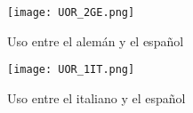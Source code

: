 \begin{figure}[h!]
	\centering
	\texttt{[image: UOR\_2GE.png]}
	\label{fig.U_GS}
	\caption{Uso entre el alemán y el español}
\end{figure}


\begin{figure}[h!]
	\centering
	\texttt{[image: UOR\_1IT.png]}
	\label{fig.U_IS}
	\caption{Uso entre el italiano y el español}
\end{figure}



